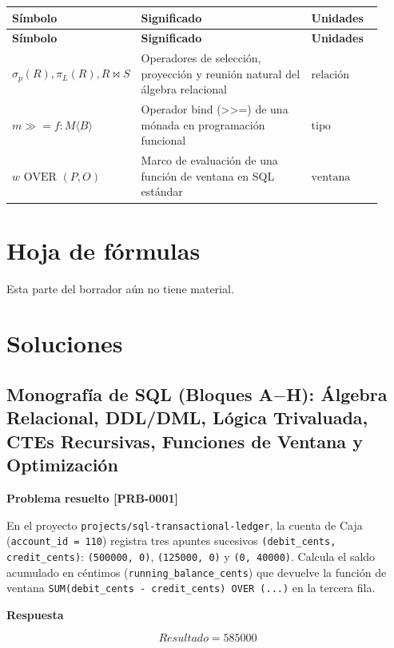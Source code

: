 \documentclass{book}
\begin{document}
\begingroup
\setlength{\LTpre}{0pt}
\setlength{\LTpost}{0pt}
\begin{longtable}{@{}>{\centering\arraybackslash}p{0.17\linewidth}>{\raggedright\arraybackslash}p{0.55\linewidth}>{\raggedright\arraybackslash}p{0.2\linewidth}@{}}
\textbf{Símbolo} & \textbf{Significado} & \textbf{Unidades} \\
\hline
\endfirsthead
\textbf{Símbolo} & \textbf{Significado} & \textbf{Unidades} \\
\hline
\endhead
$\sigma_p(R), \pi_L(R), R \bowtie S$ & Operadores de selección, proyección y reunión natural del álgebra relacional & $\mathrm{relación}$ \\
$m \gg= f : M\langle B \rangle$ & Operador bind (>>=) de una mónada en programación funcional & $\mathrm{tipo}$ \\
$w \text{ OVER } (P, O)$ & Marco de evaluación de una función de ventana en SQL estándar & $\mathrm{ventana}$ \\
\end{longtable}
\endgroup
\chapter{Hoja de fórmulas}

\noindent Esta parte del borrador aún no tiene material.
\chapter{Soluciones}

\section{Monografía de SQL (Bloques A\(-\)H): Álgebra Relacional, DDL/DML, Lógica Trivaluada, CTEs Recursivas, Funciones de Ventana y Optimización}

\noindent\textbf{Problema resuelto [PRB-0001]}

En el proyecto \texttt{projects/sql-transactional-ledger}, la cuenta de Caja (\texttt{account\_id = 110}) registra tres apuntes sucesivos \texttt{(debit\_cents, credit\_cents)}: \texttt{(500000, 0)}, \texttt{(125000, 0)} y \texttt{(0, 40000)}. Calcula el saldo acumulado en céntimos (\texttt{running\_balance\_cents}) que devuelve la función de ventana \texttt{SUM(debit\_cents - credit\_cents) OVER (...)} en la tercera fila.

\noindent\textbf{Respuesta}

\[
Resultado = 585000
\]
\end{document}

